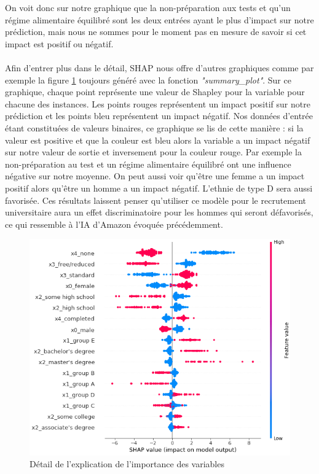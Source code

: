 On voit donc sur notre graphique que la non-préparation aux tests et qu'un régime alimentaire équilibré sont les deux entrées ayant le plus d'impact sur notre prédiction, mais nous ne sommes pour le moment pas en mesure de savoir si cet impact est positif ou négatif.


\paragraph{}Afin d'entrer plus dans le détail, SHAP nous offre d'autres graphiques comme par exemple la figure \ref{shapPlotDetail} toujours généré avec la fonction \textit{"summary\_plot"}. Sur ce graphique, chaque point représente une valeur de Shapley pour la variable pour chacune des instances. Les points rouges représentent un impact positif sur notre prédiction et les points bleu représentent un impact négatif. Nos données d'entrée étant constituées de valeurs binaires, ce graphique se lis de cette manière : si la valeur est positive et que la couleur est bleu alors la variable a un impact négatif sur notre valeur de sortie et inversement pour la couleur rouge. Par exemple la non-préparation au test et un régime alimentaire équilibré ont une influence négative sur notre moyenne. On peut aussi voir qu'être une femme a un impact positif alors qu'être un homme a un impact négatif. L’ethnie de type D sera aussi favorisée. Ces résultats laissent penser qu'utiliser ce modèle pour le recrutement universitaire aura un effet discriminatoire pour les hommes qui seront défavorisés, ce qui ressemble à l’IA d’Amazon évoquée précédemment.
\begin{figure}[h]
    \includegraphics[scale=0.6]{src_img/shapPlotDetail.png}
    \caption{Détail de l'explication de l'importance des variables}
    \label{shapPlotDetail}
\end{figure}
